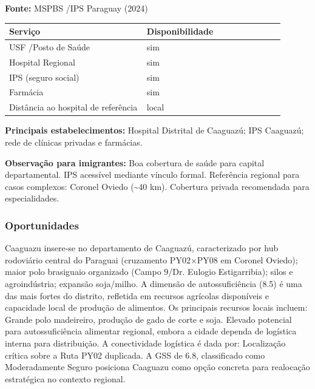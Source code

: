 \textbf{Fonte:} MSPBS /\allowbreak  IPS Paraguay (2024)

{\def\LTcaptype{none} %
\begin{longtable}{@{}>{\raggedright\arraybackslash}p{0.45\linewidth} >{\raggedright\arraybackslash}p{0.45\linewidth}@{}}
\toprule\noalign{}
Serviço & Disponibilidade \\
\midrule\noalign{}
\endhead
\bottomrule\noalign{}
\endlastfoot
USF /\allowbreak  Posto de Saúde & sim \\
Hospital Regional & sim \\
IPS (seguro social) & sim \\
Farmácia & sim \\
Distância ao hospital de referência & local \\
\end{longtable}
}

\textbf{Principais estabelecimentos:} Hospital Distrital de Caaguazú;
IPS Caaguazú; rede de clínicas privadas e farmácias.

\textbf{Observação para imigrantes:} Boa cobertura de saúde para capital
departamental. IPS acessível mediante vínculo formal. Referência
regional para casos complexos: Coronel Oviedo (\textasciitilde40 km).
Cobertura privada recomendada para especialidades.
\newpage

\subsubsection*{Oportunidades}\label{oport-caaguazu-0502}
Caaguazu insere-se no departamento de Caaguazú, caracterizado por hub rodoviário central do Paraguai (cruzamento PY02×PY08 em Coronel Oviedo); maior polo brasiguaio organizado (Campo 9/Dr. Eulogio Estigarribia); silos e agroindústria; expansão soja/milho. A dimensão de autossuficiência (8.5) é uma das mais fortes do distrito, refletida em recursos agrícolas disponíveis e capacidade local de produção de alimentos. Os principais recursos locais incluem: Grande polo madeireiro, produção de gado de corte e soja. Elevado potencial para autossuficiência alimentar regional, embora a cidade dependa de logística interna para distribuição. A conectividade logística é dada por: Localização crítica sobre a Ruta PY02 duplicada. A GSS de 6.8, classificado como Moderadamente Seguro posiciona Caaguazu como opção concreta para realocação estratégica no contexto regional.

